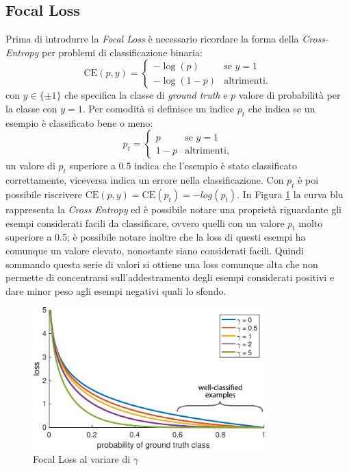 \subsection{Focal Loss}
\label{subsec:focal_loss}
Prima di introdurre la \textit{Focal Loss} è necessario ricordare la forma della \textit{Cross-Entropy} per problemi di classificazione binaria:
$$\textrm{CE}(p,y) = \begin{cases} -\log(p) &\text{se $y = 1$}\\
-\log (1 - p) &\text{altrimenti.}\end{cases}$$ con $y \in \{\pm 1 \}$ che specifica la classe di \textit{ground truth} e $p$ valore di probabilità per la classe con $y=1$.
Per comodità si definisce un indice $p_t$ che indica se un esempio è classificato bene o meno:
$$p_t = \begin{cases} p &\text{se $y = 1$}\\ 1 - p &\text{altrimenti,}\end{cases}$$
un valore di $p_t$ superiore a $0.5$ indica che l'esempio è stato classificato correttamente, viceversa indica un errore nella classificazione. Con $p_t$ è poi possibile riscrivere $\textrm{CE}(p, y) = \textrm{CE}(p_t) = -log(p_t)$. In Figura \ref{fig:focal_loss} la curva blu rappresenta la \textit{Cross Entropy} ed è possibile notare una proprietà riguardante gli esempi considerati facili da classificare, ovvero quelli con un valore $p_t$ molto superiore a 0.5; è possibile notare inoltre che la loss di questi esempi ha comunque un valore elevato, nonostante siano considerati facili. Quindi sommando questa serie di valori si ottiene una loss comunque alta che non permette di concentrarsi sull'addestramento degli esempi considerati positivi e dare minor peso agli esempi negativi quali lo sfondo. 
\begin{figure}
    \centering
    \includegraphics[width=0.8\textwidth]{images/loss.pdf}
    \caption{Focal Loss al variare di $\gamma$}
    \label{fig:focal_loss}
\end{figure}
